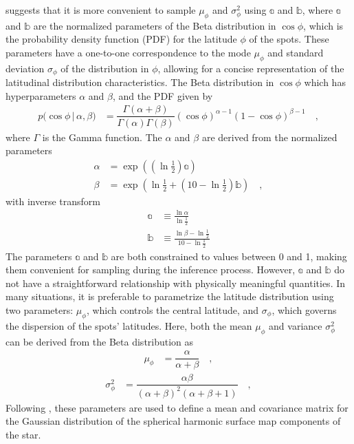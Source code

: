 \documentclass[twocolumn]{aastex631}
\begin{document}
\citet{Luger2021b} suggests that it is more convenient to sample $\mu_\phi$ and
$\sigma^2_\phi$ using $\mathbb{a}$ and $\mathbb{b}$, where $\mathbb{a}$ and
$\mathbb{b}$ are the normalized parameters of the Beta distribution in
$\cos\phi$, which is the probability density function (PDF) for the latitude
$\phi$ of the spots. These parameters have a one-to-one correspondence to the
mode $\mu_\phi$ and standard deviation $\sigma_\phi$ of the distribution in
$\phi$, allowing for a concise representation of the latitudinal distribution
characteristics. The Beta distribution in $\cos\phi$ which has hyperparameters
$\alpha$ and $\beta$, and the PDF given by
%
\begin{align}
    \label{eq:cosphi-pdf}
    p \big(\cos\phi \, \big| \, \alpha, \beta \big)
     & =
    \dfrac{\Gamma(\alpha + \beta)}{\Gamma(\alpha)\Gamma(\beta)}
    (\cos\phi)^{\alpha - 1}
    (1 - \cos\phi)^{\beta - 1}
    \quad,
\end{align}
%
where $\Gamma$ is the Gamma function. The $\alpha$ and $\beta$ are derived from the normalized parameters 
%
\begin{align}
    \label{eq:beta2gauss}
    \alpha & = \exp\left({(\ln\frac{1}{2})\mathbb{a}}\right)
    \nonumber                                                 \\
    \beta  & = \exp\left({\ln\frac{1}{2} + (10 - \ln\frac{1}{2})\mathbb{b}}\right)
    \quad,
\end{align}
%
with inverse transform
%
\begin{align}
    \label{eq:gauss2beta}
    \mathbb{a} & \equiv \frac{\ln\alpha}{\ln\frac{1}{2}}
    \nonumber                                             \\[0.5em]
    \mathbb{b} & \equiv \frac{\ln\beta - \ln\frac{1}{2}}{10 -\ln\frac{1}{2}}
\end{align}
%
The parameters $\mathbb{a}$ and $\mathbb{b}$ are both constrained to values between 0 and 1, making them convenient for sampling during the inference process. 
However, $\mathbb{a}$ and $\mathbb{b}$ do not have a straightforward relationship with physically meaningful quantities. In many situations, it is preferable to parametrize 
the latitude distribution using two parameters: $\mu_\phi$, which controls the central latitude, and $\sigma_\phi$, which governs the dispersion of the 
spots' latitudes. Here, both the mean $\mu_\phi$ and variance $\sigma^2_\phi$ can be derived from the Beta distribution as
%
\begin{align}
    \label{eq:mean_beta}
    \mu_\phi
     & =
    \dfrac{\alpha}{\alpha+\beta}
    \quad,
\end{align}
%
\begin{align}
    \label{eq:var_beta}
    \sigma^2_\phi
     & =
    \dfrac{\alpha\beta}{(\alpha+\beta)^2(\alpha+\beta+1)}
    \quad,
\end{align}
%
Following \citet{Luger2021b}, these parameters are used to define a mean and
covariance matrix for the Gaussian distribution of the spherical harmonic
surface map components of the star.  
\end{document}
